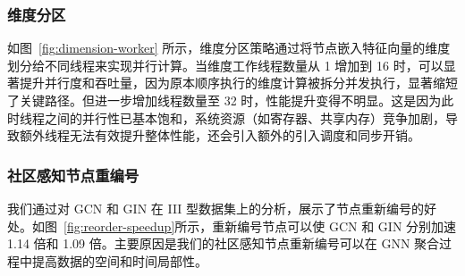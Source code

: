 \subsubsection{维度分区}
如图~\ref{fig:dimension-worker} 所示，维度分区策略通过将节点嵌入特征向量的维度划分给不同线程来实现并行计算。当维度工作线程数量从 1 增加到 16 时，可以显著提升并行度和吞吐量，因为原本顺序执行的维度计算被拆分并发执行，显著缩短了关键路径。但进一步增加线程数量至 32 时，性能提升变得不明显。这是因为此时线程之间的并行性已基本饱和，系统资源（如寄存器、共享内存）竞争加剧，导致额外线程无法有效提升整体性能，还会引入额外的引入调度和同步开销。
\subsubsection{社区感知节点重编号}
我们通过对 GCN 和 GIN 在 III 型数据集上的分析，展示了节点重新编号的好处。如图~\ref{fig:reorder-speedup}所示，重新编号节点可以使 GCN 和 GIN 分别加速 1.14 倍和 1.09 倍。主要原因是我们的社区感知节点重新编号可以在 GNN 聚合过程中提高数据的空间和时间局部性。


